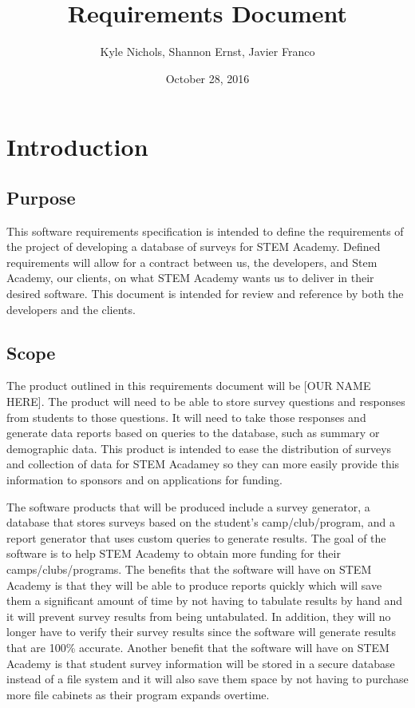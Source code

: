 \documentclass[letterpaper,10pt,titlepage, draftclsnofoot,onecolumn]{IEEEtran}
\begin{document}
\title{Requirements Document}
\author{Kyle Nichols, Shannon Ernst, Javier Franco}
\date{October 28, 2016}
\maketitle
\section{Introduction}
\subsection{Purpose}
This software requirements specification is intended to define the requirements of the project of developing a database 
of surveys for STEM Academy. Defined requirements will allow for a contract between us, the developers, and Stem Academy, 
our clients, on what STEM Academy wants us to deliver in their desired software. This document is intended for review and
reference by both the developers and the clients.
\subsection{Scope}
The product outlined in this requirements document will be [OUR NAME HERE]. The product will need to be able to store survey
questions and responses from students to those questions. It will need to take those responses and generate data reports
based on queries to the database, such as summary or demographic data. This product is intended to ease the distribution of
surveys and collection of data for STEM Acadamey so they can more easily provide this information to sponsors and on
applications for funding. %


 The software products that will be produced include a survey generator, a database that stores surveys based on the student’s camp/club/program, and a report generator that uses custom queries to generate results.  The goal of the software is to help STEM Academy to obtain more funding for their camps/clubs/programs. The benefits that the software will have on STEM Academy is that they will be able to produce reports quickly which will save them a significant amount of time by not having to tabulate results by hand and it will prevent survey results from being untabulated.  In addition, they will no longer have to verify their survey results since the software will generate results that are 100\% accurate. Another benefit that the software will have on STEM Academy is that student survey information will be stored in a secure database instead of a file system and it will also save them space by not having to purchase more file cabinets as their program expands overtime.  %
\end{document}
